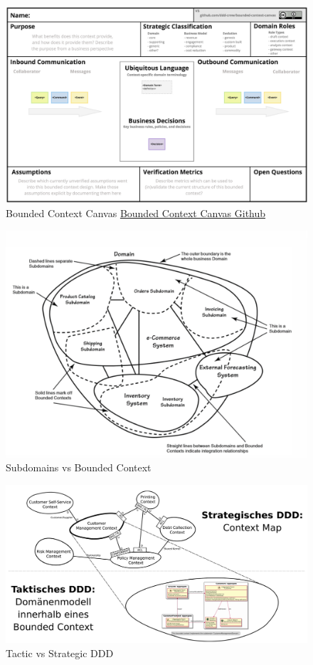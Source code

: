 \documentclass[../Main.tex]{subfiles}
\begin{document}
\begin{figure}[H]
    \centering
    \includegraphics[width=0.8\linewidth]{Images/bounded-context-canvas.jpg}
    \caption{Bounded Context Canvas \href{https://github.com/ddd-crew/bounded-context-canvas}{Bounded Context Canvas Github}}
\end{figure}

\begin{figure}[H]
    \centering
    \includegraphics[width=1\linewidth]{Images/subdomains-bounded-context.png}
    \caption{Subdomains vs Bounded Context}
\end{figure}



\begin{figure}[H]
    \centering
    \includegraphics[width=0.75\linewidth]{Images/tactic-strategic.png}
    \caption{Tactic vs Strategic DDD}
\end{figure}
\end{document}
